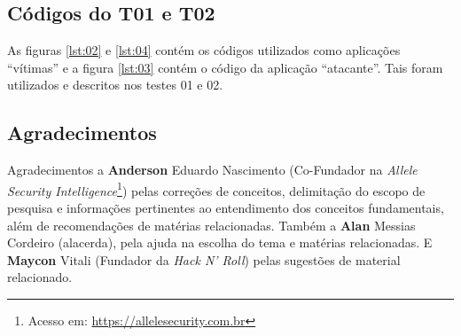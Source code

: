 \documentclass[
	article,			    %
	12pt,				    %
	oneside,			    %
	a4paper,			    %
	chapter=TITLE,		    %
	section=TITLE,		    %
	subsection=TITLE,	    %
	english,			    %
	brazil,				    %
	sumario=tradicional
]{abntex2}
\begin{document}
\postextual

\begin{apendicesenv}
\vspace{\onelineskip}
\chapter{Códigos do T01 e T02}
\label{appendix:a}
As figuras \ref{lst:02} e \ref{lst:04} contém os códigos utilizados como aplicações ``vítimas'' e a figura \ref{lst:03} contém o código da aplicação ``atacante''. Tais foram utilizados e descritos nos testes 01 e 02.



\end{apendicesenv}
\section*{Agradecimentos}
Agradecimentos a \textbf{Anderson} Eduardo Nascimento (Co-Fundador na \emph{Allele Security Intelligence}\footnote{Acesso em: \url{https://allelesecurity.com.br}}) pelas correções de conceitos, delimitação do escopo de pesquisa e informações pertinentes ao entendimento dos conceitos fundamentais, além de recomendações de matérias relacionadas. Também a \textbf{Alan} Messias Cordeiro (alacerda), pela ajuda na escolha do tema e matérias relacionadas. E \textbf{Maycon} Vitali (Fundador da \emph{Hack N' Roll}) pelas sugestões de material relacionado.
\end{document}
